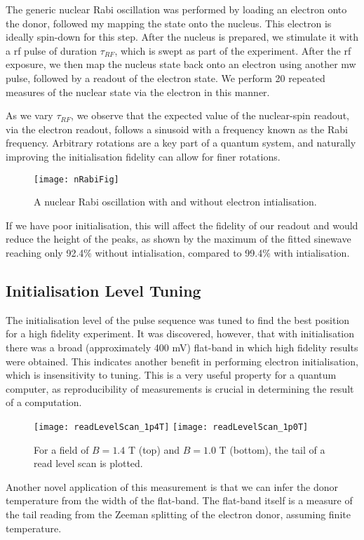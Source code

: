 	The generic nuclear Rabi oscillation was performed by loading an electron onto the donor, followed my mapping the state onto the nucleus. This electron is ideally spin-down for this step. After the nucleus is prepared, we stimulate it with a \gls{rf} pulse of duration $\tau_{RF}$, which is swept as part of the experiment. After the \gls{rf} exposure, we then map the nucleus state back onto an electron using another \gls{mw} pulse, followed by a readout of the electron state. We perform 20 repeated measures of the nuclear state via the electron in this manner.
	
	As we vary $\tau_{RF}$, we observe that the expected value of the nuclear-spin readout, via the electron readout, follows a sinusoid with a frequency known as the Rabi frequency. Arbitrary rotations are a key part of a quantum system, and naturally improving the initialisation fidelity can allow for finer rotations.
	
	\begin{figure}[H]
		\centering
		\texttt{[image: nRabiFig]}
		\caption{A nuclear Rabi oscillation with and without electron intialisation.}
		\label{fig::nuclear_rabi}
	\end{figure}
	
	If we have poor initialisation, this will affect the fidelity of our readout and would reduce the height of the peaks, as shown by the maximum of the fitted sinewave reaching only 92.4\% without intialisation, compared to 99.4\% with intialisation.

\subsection{Initialisation Level Tuning}
	The initialisation level of the pulse sequence was tuned to find the best position for a high fidelity experiment. It was discovered, however, that with initialisation there was a broad (approximately 400 mV) flat-band in which high fidelity results were obtained. This indicates another benefit in performing electron initialisation, which is insensitivity to tuning. This is a very useful property for a quantum computer, as reproducibility of measurements is crucial in determining the result of a computation.
%	
	\begin{figure}[htbp!]
		\flushleft
		\texttt{[image: readLevelScan\_1p4T]}
		\texttt{[image: readLevelScan\_1p0T]}
		\caption{For a field of $B = 1.4$ T (top) and $B = 1.0$ T (bottom), the tail of a read level scan is plotted.}
	\end{figure}
	
	Another novel application of this measurement is that we can infer the donor temperature from the width of the flat-band. The flat-band itself is a measure of the tail reading from the Zeeman splitting of the electron donor, assuming finite temperature.

